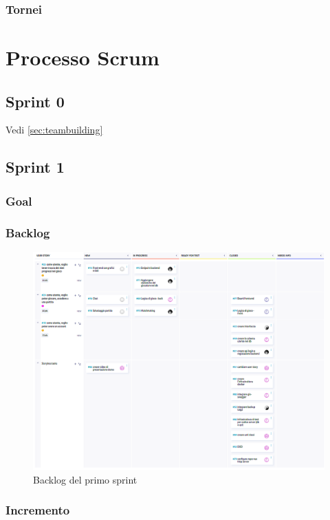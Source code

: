 \documentclass{article}
\begin{document}
\subsubsection{Tornei}

\section{Processo Scrum}

\subsection{Sprint 0}
Vedi \ref{sec:teambuilding}

\subsection{Sprint 1}

\subsubsection{Goal}

\subsubsection{Backlog}
\begin{figure}[H]
    \centering
    \includegraphics[width=1\textwidth]{backlog1}
    \caption{Backlog del primo sprint}
    \label{fig:backlog-s1}
\end{figure}

\subsubsection{Incremento}
\end{document}
